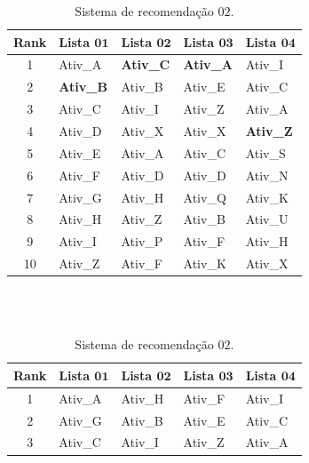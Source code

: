 \begin{table}[!htbp]
\begin{subtable}{.5\linewidth}
\begin{tabular}{cllll}
   		\textbf{Rank} & \textbf{Lista} \(\mathbf{01}\) & \textbf{Lista} \(\mathbf{02}\) & \textbf{Lista} \(\mathbf{03}\) & \textbf{Lista} \(\mathbf{04}\) \\ \hline 
   		1                & Ativ\_A	     		& \textbf{Ativ\_C}		& \textbf{Ativ\_A}	& Ativ\_I                    \\
   		2                & \textbf{Ativ\_B} 	& Ativ\_B   			& Ativ\_E   		& Ativ\_C 	                 \\
   		3                & Ativ\_C    			& Ativ\_I    			& Ativ\_Z			& Ativ\_A                    \\
   		4                & Ativ\_D   			& Ativ\_X    			& Ativ\_X    		& \textbf{Ativ\_Z}           \\
   		5                & Ativ\_E			   	& Ativ\_A			  	& Ativ\_C    		& Ativ\_S	                 \\
   		6                & Ativ\_F   			& Ativ\_D    			& Ativ\_D    		& Ativ\_N                    \\
   		7                & Ativ\_G   			& Ativ\_H    			& Ativ\_Q    		& Ativ\_K	                 \\
   		8                & Ativ\_H   			& Ativ\_Z    			& Ativ\_B   		& Ativ\_U	                 \\
   		9                & Ativ\_I    			& Ativ\_P   			& Ativ\_F   		& Ativ\_H	                 \\
   		10               & Ativ\_Z   			& Ativ\_F    			& Ativ\_K    		& Ativ\_X	           \\ \hline
   		\end{tabular}
   		 \caption{Sistema de recomendação \(02\).}
   		 \label{TABELAO:SISTEMA_RECOMENDACAO_02}
   \end{subtable}
   \\ \\ \hfill 
   \begin{subtable}{.5\linewidth}
      		\centering
      		\begin{tabular}{cllll} \hline 
      		\textbf{Rank} & \textbf{Lista} \(\mathbf{01}\) & \textbf{Lista} \(\mathbf{02}\) & \textbf{Lista} \(\mathbf{03}\) & \textbf{Lista} \(\mathbf{04}\) \\ \hline 
      		1                & Ativ\_A			    & Ativ\_H    			& Ativ\_F   		& Ativ\_I                    \\
      		2                & Ativ\_G    			& Ativ\_B   			& Ativ\_E   		& Ativ\_C 	                 \\
      		3                & Ativ\_C    			& Ativ\_I    			& Ativ\_Z			& Ativ\_A                    \\

\end{tabular}
\end{subtable}
\end{table}
